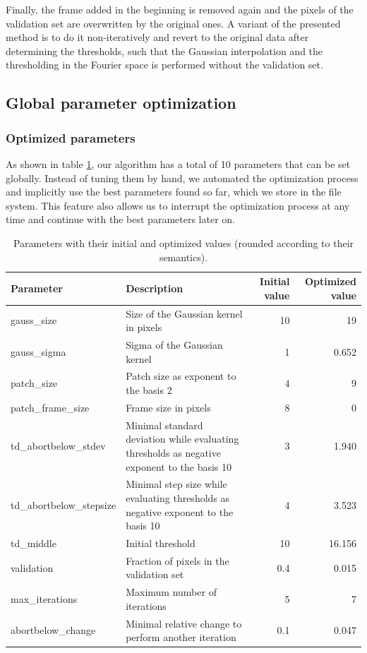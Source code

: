 \documentclass[10pt,conference,compsocconf]{IEEEtran}
\begin{document}
Finally, the frame added in the beginning is removed again and the pixels of the validation set are overwritten by the original ones. A variant of the presented method is to do it non-iteratively and revert to the original data after determining the thresholds, such that the Gaussian interpolation and the thresholding in the Fourier space is performed without the validation set.

\subsection{Global parameter optimization}
\subsubsection{Optimized parameters}
As shown in table \ref{parameters}, our algorithm has a total of 10 parameters that can be set globally. Instead of tuning them by hand, we automated the optimization process and implicitly use the best parameters found so far, which we store in the file system. This feature also allows us to interrupt the optimization process at any time and continue with the best parameters later on.

\begin{table}
\begin{center}
\begin{tabular}{|l|p{6cm}|r|r|}
\hline
Parameter & Description & Initial value & Optimized value \\
\hline
gauss\_size & Size of the Gaussian kernel in pixels & 10 & 19 \\
gauss\_sigma & Sigma of the Gaussian kernel & 1 & 0.652 \\
patch\_size & Patch size as exponent to the basis 2 & 4 & 9 \\
patch\_frame\_size & Frame size in pixels & 8 & 0 \\
td\_abortbelow\_stdev & Minimal standard deviation while evaluating thresholds as negative exponent to the basis 10 & 3 & 1.940 \\
td\_abortbelow\_stepsize & Minimal step size while evaluating thresholds as negative exponent to the basis 10 & 4 & 3.523 \\
td\_middle & Initial threshold & 10 & 16.156 \\
validation & Fraction of pixels in the validation set & 0.4 & 0.015 \\
max\_iterations & Maximum number of iterations & 5 & 7 \\
abortbelow\_change & Minimal relative change to perform another iteration & 0.1 & 0.047 \\
\hline
\end{tabular}
\end{center}
\caption{Parameters with their initial and optimized values (rounded according to their semantics).}
\label{parameters}
\end{table}
\end{document}
